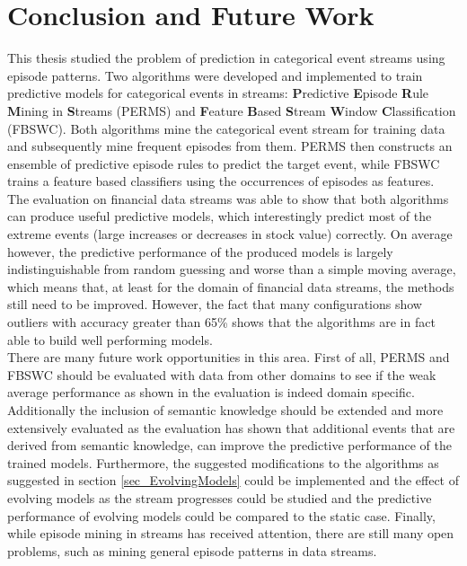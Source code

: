 \chapter{Conclusion and Future Work}
\label{chapter_conclusion}

\ifpdf
    \graphicspath{{Chapter7/Figs/Raster/}{Chapter7/Figs/PDF/}{Chapter7/Figs/}}
\else
    \graphicspath{{Chapter7/Figs/Vector/}{Chapter7/Figs/}}
\fi

This thesis studied the problem of prediction in categorical event streams using episode patterns. Two algorithms were developed and implemented to train predictive models for categorical events in streams: \textbf{P}redictive \textbf{E}pisode \textbf{R}ule \textbf{M}ining in \textbf{S}treams (PERMS) and \textbf{F}eature \textbf{B}ased \textbf{S}tream \textbf{W}indow \textbf{C}lassification (FBSWC). Both algorithms mine the categorical event stream for training data and subsequently mine frequent episodes from them. PERMS then constructs an ensemble of predictive episode rules to predict the target event, while FBSWC trains a feature based classifiers using the occurrences of episodes as features. \\
The evaluation on financial data streams was able to show that both algorithms can produce useful predictive models, which interestingly predict most of the extreme events (large increases or decreases in stock value) correctly. On average however, the predictive performance of the produced models is largely indistinguishable from random guessing and worse than a simple moving average, which means that, at least for the domain of financial data streams, the methods still need to be improved. However, the fact that many configurations show outliers with accuracy greater than 65\% shows that the algorithms are in fact able to build well performing models.\\
There are many future work opportunities in this area. First of all, PERMS and FBSWC should be evaluated with data from other domains to see if the weak average performance as shown in the evaluation is indeed domain specific. Additionally the inclusion of semantic knowledge should be extended and more extensively evaluated as the evaluation has shown that additional events that are derived from semantic knowledge, can improve the predictive performance of the trained models. Furthermore, the suggested modifications to the algorithms as suggested in section \ref{sec_EvolvingModels} could be implemented and the effect of evolving models as the stream progresses could be studied and the predictive performance of evolving models could be compared to the static case. Finally, while episode mining in streams has received attention, there are still many open problems, such as mining general episode patterns in data streams.